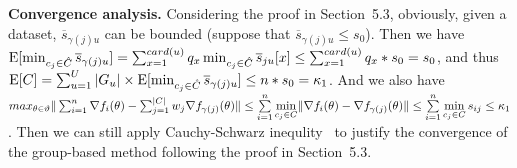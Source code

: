 \noindent \textbf{Convergence analysis.}  
Considering the proof in Section~5.3, 
obviously, given a dataset, $\overline{s}_{\gamma(j)u}$ can be bounded (suppose that $\overline{s}_{\gamma(j)u} \leq s_{0}$). Then we have
$\mathrm{E}[\min_{c_j\in \hat{C}}\overline{s}_{\gamma(j)u}] = \sum_{x=1}^{card(u)} q_x \min_{c_j \in \hat{C}} \overline{s}_{ju}[x] \leq \sum_{x= 1}^{card(u)} q_x * s_{0} = s_{0}$, and thus  $\mathrm{E}[C] = \sum_{u=1}^U  |G_u| \times\mathrm{E}[\min_{c_j\in \hat{C}}\overline{s}_{\gamma(j)u}] \leq n * s_{0} = \kappa_1$. And we also have $max_{\theta \in \vartheta} \Vert \sum_{i=1}^{n} \nabla f_{i}(\theta) - \sum_{j=1}^{\vert C \vert} w_j \nabla f_{\gamma(j)}(\theta) \Vert \leq \sum\limits_{i=1}^n \min \limits_{c_j\in C}\lVert \nabla f_i(\theta) - \nabla f_{\gamma(j)}(\theta) \rVert \leq \sum\limits_{i=1}^n \min \limits_{c_j\in C} s_{ij}  \leq \kappa_1$.
Then we can still apply Cauchy-Schwarz inequlity~\cite{strang2006linear} to justify the convergence of the group-based method following the proof in Section~5.3.
 
 
 
